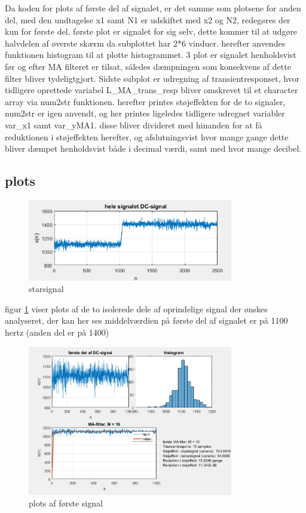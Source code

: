\documentclass{article}
\begin{document}
Da koden for plots af første del af signalet, er det samme som plotsene for anden del, med den undtagelse x1 samt N1 er udskiftet med x2 og N2, redegøres der kun for første del.
første plot er signalet for sig selv, dette kommer til at udgøre halvdelen af øverste skærm da subplottet har 2*6 vinduer.
herefter anvendes funktionen histogram til at plotte histogrammet.
3 plot er signalet henholdsvist før og efter MA filteret er tilsat, således dæmpningen som konsekvens af dette filter bliver tydeligtgjort.
Sidste subplot er udregning af transientresponset, hvor tidligere oprettede variabel L_MA_trans_resp bliver omskrevet til et character array via num2str funktionen.
herefter printes støjeffekten for de to signaler, num2str er igen anvendt, og her printes ligeledes tidligere udregnet variabler var_x1 samt var_yMA1.
disse bliver divideret med hinanden for at få reduktionen i støjeffekten herefter, og afslutningsvist hvor mange gange dette bliver dæmpet henholdsvist både i decimal værdi, samt med hvor mange decibel.

\subsection{plots}
\label{sec:plots}

\begin{figure}[h!]
  \centering
  \includegraphics[width=0.8\textwidth]{rod/startsignal.png}
  \caption{starsignal}
  \label{fig:2signaler}
\end{figure}

figur \ref{fig:2signaler} viser plots af de to isolerede dele af oprindelige signal der ønskes analyseret, der kan her ses middelværdien på første del af signalet er på 1100 hertz (anden del er på 1400)

\begin{figure}[h!]
  \centering
  \includegraphics[width=0.8\textwidth]{rod/1MAfilter.png}
  \caption{plots af første signal}
  \label{fig:1signalplot}
\end{figure}
\end{document}
